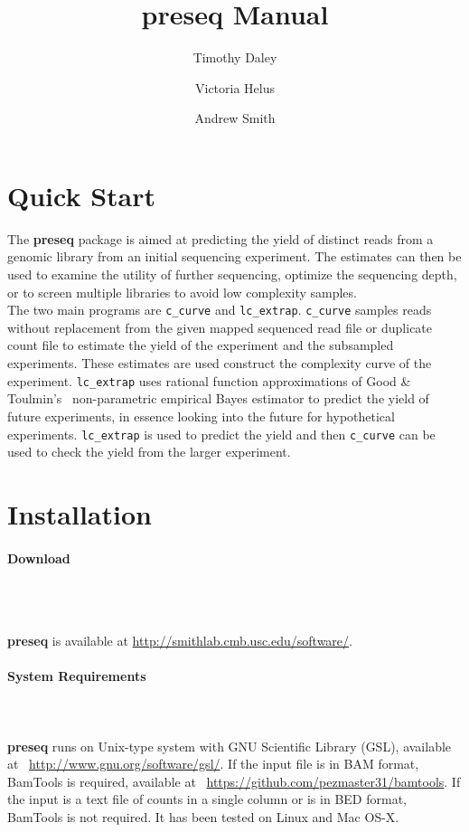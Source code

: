 \documentclass[11pt, titlepage]{article}
\title{preseq Manual}
\author{Timothy Daley \and Victoria Helus \and Andrew Smith }
\begin{document}
\maketitle



\section*{Quick Start}
\label{chap:quickstart}
\newcommand{\fn}[1]{\texttt{#1}}



The \textbf{preseq} package is aimed at predicting
the yield of distinct reads from a genomic library
from an initial sequencing experiment.  The estimates
can then be used to examine the utility of further
sequencing, optimize the sequencing depth,
or to screen multiple libraries to avoid low complexity
samples.~\\[-.2cm]

\noindent The two main programs are \fn{c\_curve} and \fn{lc\_extrap}.
\fn{c\_curve} samples reads without replacement from the 
given mapped sequenced read file or duplicate count file to estimate the yield
of the experiment and the subsampled experiments.  These estimates
are used construct the complexity
curve of the experiment.  \fn{lc\_extrap} uses rational function approximations
of Good \& Toulmin's~\cite{good1956number} non-parametric
empirical Bayes estimator to predict the yield
of future experiments, in essence looking into the future
for hypothetical experiments.  \fn{lc\_extrap} is used to predict 
the yield and then \fn{c\_curve} can be used to check the yield
from the larger experiment.

\newpage

\section{Installation}
\label{sec:install}

\paragraph{Download}
\label{sub:download}~\\~\\[-.2cm]
\raggedright{\textbf{preseq} is available at }
\url{http://smithlab.cmb.usc.edu/software/}.


\paragraph{System Requirements}
\label{sub:require}
~\\~\\[-.2cm]
\textbf{preseq} runs on Unix-type system
with GNU Scientific Library (GSL), available
at ~\url{http://www.gnu.org/software/gsl/}.  
If the input file is in BAM format, BamTools is
required, available at ~\url{https://github.com/pezmaster31/bamtools}.
If the input is 
a text file of counts in a single column or is 
in BED format, 
BamTools is not required.
It has been tested on Linux and 
Mac OS-X.  
\end{document}
